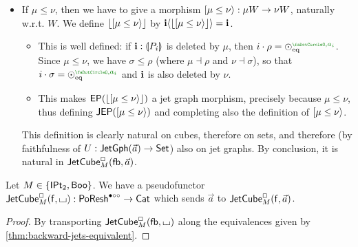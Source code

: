 \documentclass[a4paper]{memoir}
\begin{document}
\begin{definition}
\begin{itemize}
\begin{itemize}
\begin{itemize}
			\end{itemize}
			\item If $\mu \leq \nu$, then we have to give a morphism $\mathopen{}\left[ \mu \leq \nu \right\rangle\mathclose{} : \mu W \to \nu W$, naturally w.r.t. $W$.
			We define $\mathopen{}\left\lfloor \mathopen{}\left[ \mu \leq \nu \right\rangle\mathclose{} \right\rfloor\mathclose{}$ by $\mathbf{i} \langle \mathopen{}\left\lfloor \mathopen{}\left[ \mu \leq \nu \right\rangle\mathclose{} \right\rfloor\mathclose{} \rangle = \mathbf{i}$.
			\begin{itemize}
				\item This is well defined: if $\mathbf{i} : {\llparenthesis P_i \rrparenthesis}$ is deleted by $\mu$, then $i \cdot \rho = \nonpol_\eqtydeg\pmrhom{\npolar}{a_i}$.
				Since $\mu \leq \nu$, we have $\sigma \leq \rho$ (where $\mu \dashv \rho$ and $\nu \dashv \sigma$), so that $i \cdot \sigma = \nonpol_\eqtydeg\pmrhom{\npolar}{a_i}$ and $\mathbf{i}$ is also deleted by $\nu$.
				\item This makes $\mathsf{EP}(\mathopen{}\left\lfloor \mathopen{}\left[ \mu \leq \nu \right\rangle\mathclose{} \right\rfloor\mathclose{})$ a jet graph morphism, precisely because $\mu \leq \nu$, thus defining $\mathsf{JEP}(\mathopen{}\left[ \mu \leq \nu \right\rangle\mathclose{})$ and completing also the definition of $\mathopen{}\left[ \mu \leq \nu \right\rangle\mathclose{}$.
			\end{itemize}
			
			This definition is clearly natural on cubes, therefore on sets, and therefore (by faithfulness of $U : \mathsf{JetGph}(\vec a) \to {\mathsf{Set}}$) also on jet graphs. By conclusion, it is natural in $\mathsf{JetCube}^{\Box}_{M}({\mathsf{fb}},\vec a)$.
		\end{itemize}
	\end{itemize}
\end{definition}
\begin{corollary}
	Let $M \in \mathopen{}\left\{ {\mathsf{IPt}_2}, \mathsf{Boo} \right\}\mathclose{}$.
	We have a pseudofunctor $\mathsf{JetCube}^{\Box}_{M}({\mathsf{f}},{\llcorner\hspace{-.4ex}\lrcorner}) : \mathsf{PoResh}^{\bullet \circ \circ} \to {\mathsf{Cat}}$ which sends $\vec a$ to $\mathsf{JetCube}^{\Box}_{M}({\mathsf{f}},\vec a)$.
\end{corollary}
\begin{proof}
	By transporting $\mathsf{JetCube}^{\Box}_{M}({\mathsf{fb}},{\llcorner\hspace{-.4ex}\lrcorner})$ along the equivalences given by \cref{thm:backward-jets-equivalent}.
\end{proof}
\end{document}
